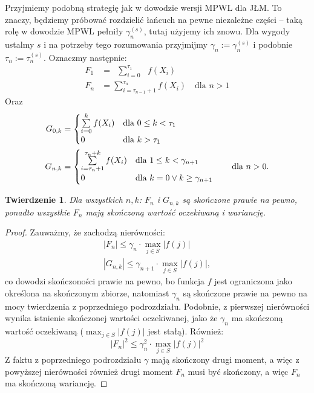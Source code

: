 \documentclass[a4paper]{article}
\theoremstyle{defn}
\theoremstyle{theorem}
\newtheorem{theorem}[defn]{Twierdzenie}
\theoremstyle{lemma}
\theoremstyle{cor}
\theoremstyle{fact}
\begin{document}
Przyjmiemy podobną strategię jak w dowodzie wersji MPWL dla JŁM. To znaczy, będziemy próbować rozdzielić łańcuch na pewne niezależne części – taką rolę w dowodzie MPWL pełniły $\gamma_n^{(s)}$, tutaj użyjemy ich znowu. Dla wygody ustalmy $s$ i na potrzeby tego rozumowania przyjmijmy $\gamma_n := \gamma_n^{(s)}$ i podobnie $\tau_n := \tau_n^{(s)}$.
Oznaczmy następnie:
\begin{align*}
    F_1 &= \,\,\,\sum\limits_{i = 0}^{\tau_1} \,\,\,\,f(X_i)\\
    F_n &= \sum\limits_{i = \tau_{n-1}+1}^{\tau_n} f(X_i) \quad \text{dla $n > 1$}
\end{align*}
Oraz
\begin{align*}
    G_{0, k} &= \begin{cases}
    \sum\limits_{i = 0}^{k} f(X_i) &\text{dla $0 \leq k < \tau_{1}$}\\
    0  &\text{dla $k > \tau_1$}
    \end{cases}
    \\
    G_{n, k} &= \begin{cases}\sum\limits_{i = \tau_n+1}^{\tau_n+k} f(X_i) &\text{dla $1 \leq k < \gamma_{n+1}$}\\
    0 &\text{dla $k=0 \lor k \geq \gamma_{n+1}$}
    \end{cases} \text{\quad\quad dla $n > 0.$}
\end{align*}
\begin{theorem}\label{theorem2.6.2}
Dla wszystkich $n,k$: $F_n$ i $G_{n,k}$ są skończone prawie na pewno, ponadto wszystkie $F_n$ mają skończoną wartość oczekiwaną i wariancję.
\end{theorem}
\begin{proof}
Zauważmy, że zachodzą nierówności:
\begin{align*}
    |F_n| \leq \gamma_n \cdot \max_{j \in S} |f(j)|\\
    |G_{n,k}| \leq \gamma_{n+1} \cdot \max_{j \in S} |f(j)|,
\end{align*}
co dowodzi skończoności prawie na pewno, bo funkcja $f$ jest ograniczona jako określona na skończonym zbiorze, natomiast $\gamma_n$ są skończone prawie na pewno na mocy twierdzenia z poprzedniego podrozdziału. Podobnie, z pierwszej nierówności wynika istnienie skończonej wartości oczekiwanej, jako że $\gamma_n$ ma skończoną wartość oczekiwaną ($\max_{j \in S} |f(j)|$ jest stałą). Również:
$$|F_n|^2 \leq \gamma_n^2 \cdot \max_{j \in S} |f(j)|^2$$
Z faktu z poprzedniego podrozdziału $\gamma$ mają skończony drugi moment, a więc z powyższej nierówności również drugi moment $F_n$ musi być skończony, a więc $F_n$ ma skończoną wariancję.
\end{proof}
\end{document}

